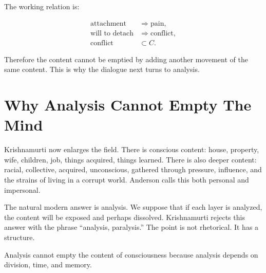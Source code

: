 The working relation is:

\begin{align}
\text{attachment} &\Rightarrow \text{pain}, \\
\text{will to detach} &\Rightarrow \text{conflict}, \\
\text{conflict} &\subset C.
\end{align}

Therefore the content cannot be emptied by adding another movement of the same content. This is why the dialogue next turns to analysis.

\section{Why Analysis Cannot Empty The Mind}

Krishnamurti now enlarges the field. There is conscious content: house, property, wife, children, job, things acquired, things learned. There is also deeper content: racial, collective, acquired, unconscious, gathered through pressure, influence, and the strains of living in a corrupt world. Anderson calls this both personal and impersonal.

The natural modern answer is analysis. We suppose that if each layer is analyzed, the content will be exposed and perhaps dissolved. Krishnamurti rejects this answer with the phrase ``analysis, paralysis.'' The point is not rhetorical. It has a structure.

\begin{proposition}
Analysis cannot empty the content of consciousness because analysis depends on division, time, and memory.
\end{proposition}

